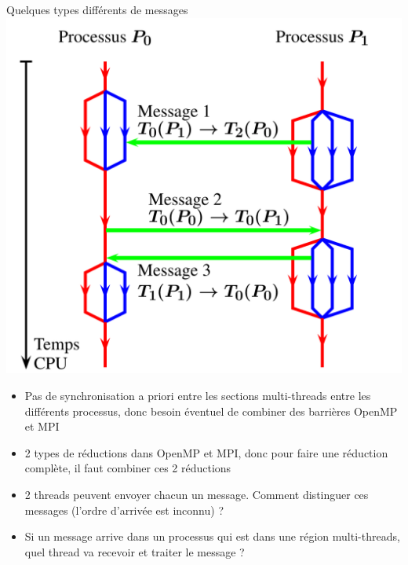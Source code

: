 \documentclass{beamer}
\begin{document}
\begin{frame}
	Quelques types différents de messages
	\includegraphics[scale=0.4]{../../Images/enchainementHybride2}
\end{frame}

\begin{frame}
	\vfill
\begin{itemize}
	\item Pas de synchronisation a priori entre les sections multi-threads entre les différents processus, donc besoin éventuel de combiner des barrières OpenMP et MPI
	\vfill
	
	\item 2 types de réductions dans OpenMP et MPI, donc pour faire une réduction complète, il faut combiner ces 2 réductions
	\vfill
	
	\item 2 threads peuvent envoyer chacun un message. Comment  distinguer ces messages (l'ordre d'arrivée est inconnu) ?
	
	\vfill
	\item Si un message arrive dans un processus qui est dans une région multi-threads, quel thread va recevoir et traiter le message ?
\end{itemize}
	\vfill	
	
\end{frame}
\end{document}
